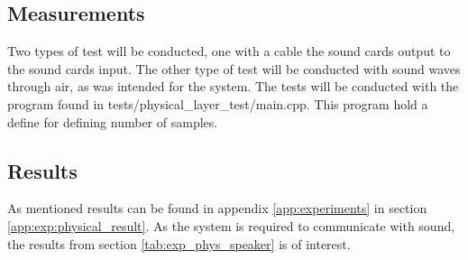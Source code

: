 	\subsection{Measurements}
	Two types of test will be conducted, one with a cable the sound cards output to the sound cards input. The other type of test will be conducted with sound waves through air, as was intended for the system.
	The tests will be conducted with the program found in tests/physical\_layer\_test/main.cpp. This program hold a define for defining number of samples.
	
	\subsection{Results}
	As mentioned results can be found in appendix \ref{app:experiments} in section \ref{app:exp:physical_result}. As the system is required to communicate with sound, the results from section \ref{tab:exp_phys_speaker} is of interest.